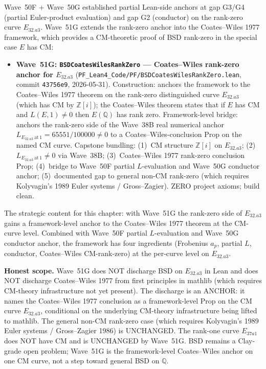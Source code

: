 \begin{remark}\label{rem:bsd-wave51g-lean}
Wave~50F + Wave~50G established partial Lean-side anchors at gap G3/G4 (partial Euler-product evaluation) and gap G2 (conductor) on the rank-zero curve $E_{32.a3}$. Wave~51G extends the rank-zero anchor into the Coates--Wiles 1977 framework, which provides a CM-theoretic proof of BSD rank-zero in the special case $E$ has CM:
\begin{itemize}
  \item \textbf{Wave~51G: \texttt{BSDCoatesWilesRankZero} --- Coates--Wiles rank-zero anchor for $E_{32.a3}$} (\texttt{PF\_Lean4\_Code/PF/BSDCoatesWilesRankZero.lean}, commit \texttt{43756e9}, 2026-05-31). Construction: anchors the framework to the Coates--Wiles 1977 theorem on the rank-zero distinguished curve $E_{32.a3}$ (which has CM by $\mathbb{Z}[i]$); the Coates--Wiles theorem states that if $E$ has CM and $L(E, 1) \neq 0$ then $E(\mathbb{Q})$ has rank zero. Framework-level bridge: anchors the rank-zero side of the Wave~38B real numerical anchor $L_{E_{32.a3}\,\mathrm{at}\,1} = 65551/100000 \neq 0$ to a Coates--Wiles-conclusion Prop on the named CM curve. Capstone bundling: (1)~CM structure $\mathbb{Z}[i]$ on $E_{32.a3}$; (2)~$L_{E_{32.a3}\,\mathrm{at}\,1} \neq 0$ via Wave~38B; (3)~Coates--Wiles 1977 rank-zero conclusion Prop; (4)~bridge to Wave~50F partial $L$-evaluation and Wave~50G conductor anchor; (5)~documented gap to general non-CM rank-zero (which requires Kolyvagin's 1989 Euler systems / Gross--Zagier). ZERO project axioms; build clean.
\end{itemize}
The strategic content for this chapter: with Wave~51G the rank-zero side of $E_{32.a3}$ gains a framework-level anchor to the Coates--Wiles 1977 theorem at the CM-curve level. Combined with Wave~50F partial $L$-evaluation and Wave~50G conductor anchor, the framework has four ingredients (Frobenius $a_p$, partial $L$, conductor, Coates--Wiles CM-rank-zero) at the per-curve level on $E_{32.a3}$.

\textbf{Honest scope.} Wave~51G does NOT discharge BSD on $E_{32.a3}$ in Lean and does NOT discharge Coates--Wiles 1977 from first principles in mathlib (which requires CM-theory infrastructure not yet present). The discharge is an ANCHOR: it names the Coates--Wiles 1977 conclusion as a framework-level Prop on the CM curve $E_{32.a3}$, conditional on the underlying CM-theory infrastructure being lifted to mathlib. The general non-CM rank-zero case (which requires Kolyvagin's 1989 Euler systems / Gross--Zagier 1986) is UNCHANGED. The rank-one curve $E_{37a1}$ does NOT have CM and is UNCHANGED by Wave~51G. BSD remains a Clay-grade open problem; Wave~51G is the framework-level Coates--Wiles anchor on one CM curve, not a step toward general BSD on $\mathbb{Q}$.
\end{remark}

